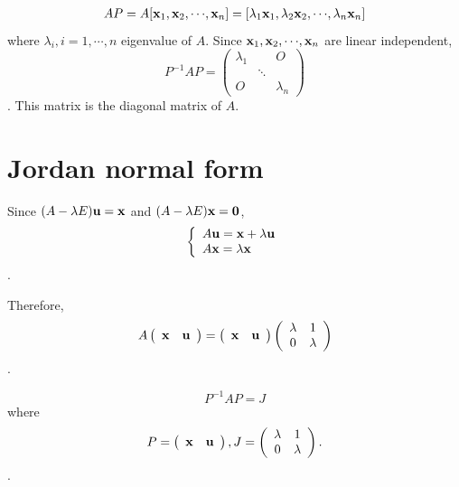 \documentclass[dvipdfmx]{article}
\begin{document}
\begin{eqnarray}
AP = A[{\bf{x}}_1, {\bf{x}}_2, {\cdots}, {\bf{x}}_n]
     = [{\lambda}_1{\bf{x}}_1, {\lambda}_2{\bf{x}}_2, {\cdots}, {\lambda}_n{\bf{x}}_n] \nonumber
\end{eqnarray}
where ${\lambda}_i, i=1,{\cdots},n$ eigenvalue of $A$.
Since ${\bf{x}}_1, {\bf{x}}_2, {\cdots}, {\bf{x}}_n$ are linear independent,
\[
  P^{-1}AP =
  \left(
  \begin{array}{ccc}
  {\lambda}_{1} & \ & O \\
  \          & \ddots  & \    \\
  O        &   \          & {\lambda}_{n}
  \end{array}
  \right)
\] .
This matrix is the diagonal matrix of $A$.
 
 
\section*{Jordan normal form}
Since $(A - {\lambda}E){\bf{u}} = {\bf{x}}$ and $(A - {\lambda}E){\bf{x}} = {\bf{0}}$,
\begin{eqnarray}
\left\{ \begin{array}{ll}
A{\bf{u}}= {\bf{x}} + {\lambda}{\bf{u}} \\
A{\bf{x}}={\lambda}{\bf{x}} \\
\end{array} \right.
\end{eqnarray} .

Therefore,
 \[
   A
   \left(
   \begin{array}{cc}
   {\bf{x}} & {\bf{u}} 
   \end{array}
   \right)
   =
   \left(
   \begin{array}{cc}
   {\bf{x}} & {\bf{u}} 
   \end{array}
   \right)
   \left(
   \begin{array}{cc}
   {\lambda} & 1 \\
   0 & {\lambda}
   \end{array}
   \right)
  \] .

$$P^{-1}AP = J$$ where
\[
   P =
   \left(
   \begin{array}{cc}
   {\bf{x}} & {\bf{u}} 
   \end{array}
   \right) ,
   J =
   \left(
   \begin{array}{cc}
   {\lambda} & 1 \\
   0 & {\lambda}
   \end{array}
   \right).
  \] .
  
\end{document}
